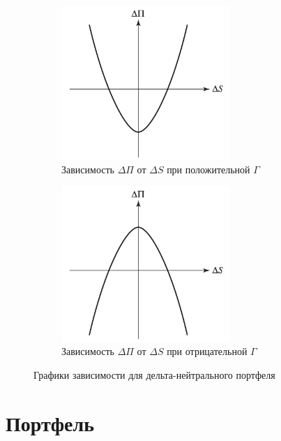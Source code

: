 \documentclass{article}
\begin{document}
\begin{figure}[h]
	\centering
	\begin{subfigure}{.49\textwidth}
		\centering
		\includegraphics[width=0.7\textwidth]{pos-gamma.jpg}
		\caption{Зависимость $\Delta\Pi$ от $\Delta S$ при положительной $\Gamma$}
		\label{model}
	\end{subfigure}
	\begin{subfigure}{.5\textwidth}
		\centering
		\includegraphics[width=0.7\textwidth]{neg-gamma.jpg}
		\caption{Зависимость $\Delta\Pi$ от $\Delta S$ при отрицательной $\Gamma$}
		\label{model}
	\end{subfigure}
	
	\caption{Графики зависимости для дельта-нейтрального портфеля}
	\label{model}
\end{figure}

\section{Портфель}
\end{document}
